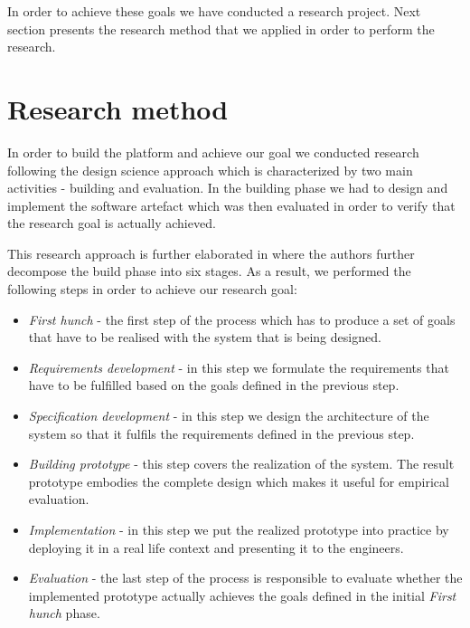 In order to achieve these goals we have conducted a research project. Next section presents the research method that we applied in order to perform the research.

\section{Research method}

In order to build the platform and achieve our goal we conducted research following the design science approach \cite{hevner2004design} which is characterized by two main activities - building and evaluation. In the building phase we had to design and implement the software artefact which was then evaluated in order to verify that the research goal is actually achieved.

This research approach is further elaborated in \cite{verschuren2005evaluation} where the authors further decompose the build phase into six stages. As a result, we performed the following steps in order to achieve our research goal:

\begin{itemize}
	\item \textit{First hunch} - the first step of the process which has to produce a set of goals that have to be realised with the system that is being designed.
	
	\item \textit{Requirements development} - in this step we formulate the requirements that have to be fulfilled based on the goals defined in the previous step.
	
	\item \textit{Specification development} - in this step we design the architecture of the system so that it fulfils the requirements defined in the previous step.
	
	\item \textit{Building prototype} - this step covers the realization of the system. The result prototype embodies the complete design which makes it useful for empirical evaluation.
	
	\item \textit{Implementation} - in this step we put the realized prototype into practice by deploying it in a real life context and presenting it to the engineers.
	
	\item \textit{Evaluation} - the last step of the process is responsible to evaluate whether the implemented prototype actually achieves the goals defined in the initial \textit{First hunch} phase. 
\end{itemize}  

